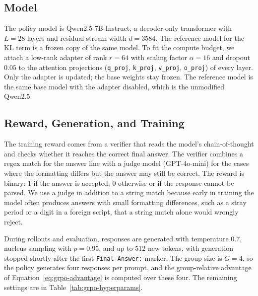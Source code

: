 \subsection{Model}
\label{subsec:grpo-model}

The policy model is Qwen2.5-7B-Instruct, a decoder-only transformer with $L=28$
layers and residual-stream width $d=3584$. The reference model for the KL term is a
frozen copy of the same model. To fit the compute budget, we attach a low-rank
adapter \citep{hu2022lora} of rank $r=64$ with scaling factor $\alpha=16$ and dropout
$0.05$ to the attention projections (\texttt{q\_proj}, \texttt{k\_proj},
\texttt{v\_proj}, \texttt{o\_proj}) of every layer. Only the adapter is updated; the
base weights stay frozen. The reference model is the same base model with the adapter
disabled, which is the unmodified Qwen2.5.

\subsection{Reward, Generation, and Training}
\label{subsec:grpo-reward}

The training reward comes from a verifier that reads the model's chain-of-thought and
checks whether it reaches the correct final answer. The verifier combines a regex
match for the answer line with a judge model (GPT-4o-mini) for the cases where the
formatting differs but the answer may still be correct. The reward is binary: $1$ if
the answer is accepted, $0$ otherwise or if the response cannot be parsed. We use a
judge in addition to a string match because early in training the model often
produces answers with small formatting differences, such as a stray period or a digit
in a foreign script, that a string match alone would wrongly reject.

During rollouts and evaluation, responses are generated with temperature $0.7$,
nucleus sampling with $p=0.95$, and up to $512$ new tokens, with generation stopped
shortly after the first \texttt{Final Answer:} marker. The group size is $G=4$, so
the policy generates four responses per prompt, and the group-relative advantage of
Equation~\ref{eq:grpo-advantage} is computed over these four. The remaining settings
are in Table~\ref{tab:grpo-hyperparams}.

